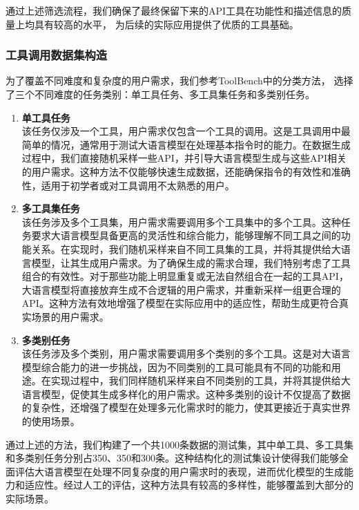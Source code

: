 通过上述筛选流程，我们确保了最终保留下来的API工具在功能性和描述信息的质量上均具有较高的水平，
为后续的实际应用提供了优质的工具基础。

\subsubsection{工具调用数据集构造}

为了覆盖不同难度和复杂度的用户需求，我们参考ToolBench中的分类方法，
选择了三个不同难度的任务类别：单工具任务、多工具集任务和多类别任务。

\begin{enumerate}
  \item \textbf{单工具任务} \\
    该任务仅涉及一个工具，用户需求仅包含一个工具的调用。这是工具调用中最简单的情况，通常用于测试大语言模型在处理基本指令时的能力。在数据生成过程中，我们直接随机采样一些API，并引导大语言模型生成与这些API相关的用户需求。这种方法不仅能够快速生成数据，还能确保指令的有效性和准确性，适用于初学者或对工具调用不太熟悉的用户。

  \item \textbf{多工具集任务} \\
    该任务涉及多个工具集，用户需求需要调用多个工具集中的多个工具。这种任务要求大语言模型具备更高的灵活性和综合能力，能够理解不同工具之间的功能关系。在实现时，我们随机采样来自不同工具集的工具，并将其提供给大语言模型，让其生成用户需求。为了确保生成的需求合理，我们特别考虑了工具组合的有效性。对于那些功能上明显重复或无法自然组合在一起的工具API，大语言模型将直接放弃生成不合逻辑的用户需求，并重新采样一组更合理的API。这种方法有效地增强了模型在实际应用中的适应性，帮助生成更符合真实场景的用户需求。

  \item \textbf{多类别任务} \\
    该任务涉及多个类别，用户需求需要调用多个类别的多个工具。这是对大语言模型综合能力的进一步挑战，因为不同类别的工具可能具有不同的功能和用途。在实现过程中，我们同样随机采样来自不同类别的工具，并将其提供给大语言模型，促使其生成多样化的用户需求。这种多类别的设计不仅提高了数据的复杂性，还增强了模型在处理多元化需求时的能力，使其更接近于真实世界的使用场景。

\end{enumerate}

通过上述的方法，我们构建了一个共1000条数据的测试集，其中单工具、多工具集和多类别任务分别占350、350和300条。这种结构化的测试集设计使得我们能够全面评估大语言模型在处理不同复杂度的用户需求时的表现，进而优化模型的生成能力和适应性。经过人工的评估，这种方法具有较高的多样性，能够覆盖到大部分的实际场景。

